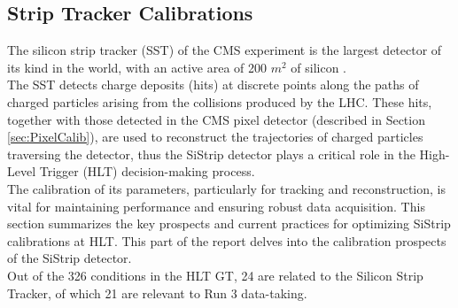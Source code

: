 \subsection{Strip Tracker Calibrations}

The silicon strip tracker (SST) of the CMS experiment is the largest detector of its kind in the world, with an active area of 200 $m^{2}$ of silicon \cite{Karimaki:368412,CMS:2000eqx,CMSTrackerGroup:2020edz}.\\
The SST detects charge deposits (hits) at discrete points along the paths of charged particles arising from the collisions produced by the LHC. These hits, together with those detected in the CMS pixel detector (described in Section \ref{sec:PixelCalib}), are used to reconstruct the trajectories of charged particles traversing the detector, thus the SiStrip detector plays a critical role in the High-Level Trigger (HLT) decision-making process.\\
The calibration of its parameters, particularly for tracking and reconstruction, is vital for maintaining performance and ensuring robust data acquisition. This section summarizes the key prospects and current practices for optimizing SiStrip calibrations at HLT.\newline \newline
This part of the report delves into the calibration prospects of the SiStrip detector.\\
Out of the 326 conditions in the HLT GT, 24 are related to the Silicon Strip Tracker, of which 21 are relevant to Run 3 data-taking. 

